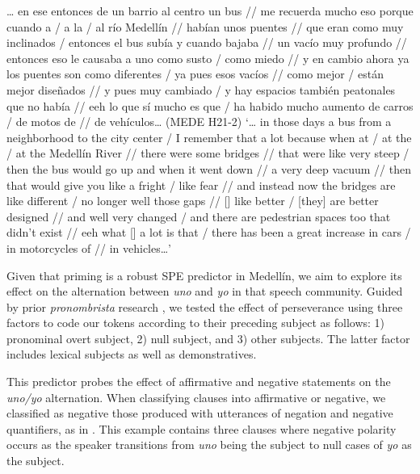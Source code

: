 \documentclass[output=paper]{langscibook}
\begin{document}
\eanoraggedright\label{ex:orozco:4}
{… en ese entonces}  {de un barrio al centro un bus // me recuerda mucho eso porque cuando}  {a / a la / al río Medellín // habían unos puentes // que eran como muy inclinados / entonces el bus subía y cuando bajaba //}  {un vacío muy profundo // entonces eso le causaba a uno como susto / como miedo // y en cambio ahora ya los puentes son como diferentes / ya}  {pues esos vacíos //}  {como mejor / están mejor diseñados // y pues muy cambiado / y hay espacios también peatonales que no había // eeh lo que sí}  {mucho es que / ha habido mucho aumento de carros / de motos de // de vehículos…} (MEDE H21-2)
\glt ‘… in those days    a bus from a neighborhood to the city center / I remember that a lot because when   at / at  the / at the Medellín River // there were some bridges // that were like very steep / then the bus would go up and when it went down //   a very deep vacuum // then that would give you like a fright / like fear // and instead now the bridges are like different /  no longer  well those gaps // []  like better / [they] are better designed // and well very changed / and there are pedestrian spaces too that didn’t exist // eeh what []   a lot is that / there has been a great increase in cars / in motorcycles of // in vehicles…’
\z 

Given that priming is a robust SPE predictor in Medellín, we aim to explore its effect on the alternation between \textit{uno} and \textit{yo} in that speech community. Guided by prior \textit{pronombrista} research \citep{Orozco2018}, we tested the effect of perseverance using three factors to code our tokens according to their preceding subject as follows: 1) pronominal overt subject, 2) null subject, and 3) other subjects. The latter factor includes lexical subjects as well as demonstratives.  

\label{sec:orozco:3.3.1.3}



This predictor probes the effect of affirmative and negative statements on the \textit{uno/yo} alternation. When classifying clauses into affirmative or negative, we classified as negative those produced with utterances of negation and negative quantifiers, as in . This example contains three clauses where negative polarity occurs as the speaker transitions from \textit{uno} being the subject to null cases of \textit{yo} as the subject.
\end{document}

